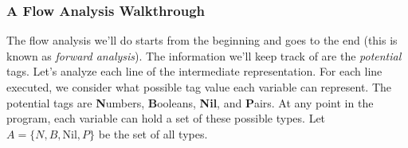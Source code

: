 \documentclass[letterpaper]{article}
\begin{document}
\newpage 
\thispagestyle{noheader}
\subsubsection{A Flow Analysis Walkthrough}
The flow analysis we'll do starts from the beginning and goes to the end (this is known as \emph{forward analysis}). The information we'll keep track of are the \emph{potential} tags. Let's analyze each line of the intermediate representation. For each line executed, we consider what possible tag value each variable can represent. The potential tags are \textbf{N}umbers, \textbf{B}ooleans, \textbf{Nil}, and \textbf{P}airs. At any point in the program, each variable can hold a set of these possible types. Let $A = \{N, B, \text{Nil}, P\}$ be the set of all types.
\end{document}
